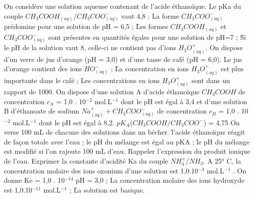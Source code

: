  \q	
 On considère une solution aqueuse contenant de l’acide éthanoïque.
Le pKa du couple $CH_3COOH_{(aq)}/ CH_3COO^{-}_{(aq)}$  vaut 4,8 ;
\rv
  La forme $CH_3COO^{-}_{(aq)}$  prédomine  pour une solution de pH = 6,5 ;
\r
  Les formes $CH_3COOH_{(aq)}$ et $CH_3COO^{-}_{(aq)}$ sont présentes en quantités égales pour une solution de pH=7 ;
\r
  Si le pH de la solution vaut 8, celle-ci ne contient pas d’ions $H_3O^+_{(aq)}$.
  \q
  	On dispose d’un verre de jus d’orange (pH = 3,0) et d’une tasse de café (pH = 6,0). 
\rv
 	Le jus d’orange contient des ions $HO^{-}_{(aq)}$ ; 
\r
 	La concentration en ions $H_3O^+_{(aq)}$  est plus importante dans le café ;
\rv
 	Les concentrations en ions $H_3O^+_{(aq)}$ sont dans un rapport de  1000.
 \q	
 On dispose d'une solution A d'acide éthanoïque $CH_3COOH$ de concentration  $c_A$  = 1,0 . 10$^{-2}$ mol.L$^{-1}$ dont le pH est égal à 3,4 et d'une solution B d'éthanoate de sodium $Na^{+}_{(aq)} + CH_3COO^{-}_{(aq)}$ de concentration  $c_B$  = 1,0 . 10$^{-2}$ mol.L$^{-1}$ dont le pH est égal à 8,2. 
$pK_A$($CH_3COOH/ CH_3COO^{-}$) = 4,75 
On verse 100 mL de chacune des solutions dans un bécher.
\r
  l'acide éthanoïque réagit de façon totale avec l'eau ;
\rv
  le pH du mélange est égal au pKA ;
\r
  le pH du mélange est modifié si l'on rajoute 100 mL d'eau.
\q
	Rappeler l’expression du produit ionique de l’eau.
 \q	
 Exprimer la constante d’acidité Ka du couple $NH_4^+/ NH_3$.
 \q	
 A 25° C, la concentration molaire des ions oxonium d’une solution est 1,0.10$^{-3}$ mol.L$^{-1}$ . 
On donne Ke = 1,0 . 10$^{-14}$ 
  \rv
  pH = 3,0 ;
 \rv La concentration molaire des ions hydroxyde est 1,0.10$^{-11}$ mol.L$^{-1}$ ;
\r
  La solution est basique.

